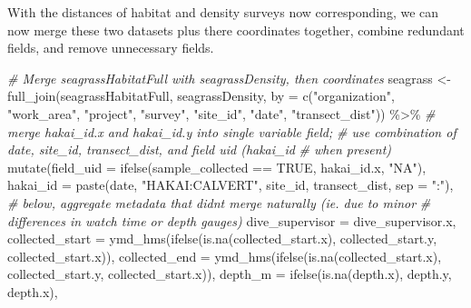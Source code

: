 \documentclass[
]{book}
\newenvironment{Shaded}{\begin{snugshade}}{\end{snugshade}}
\newcommand{\AttributeTok}[1]{\textcolor[rgb]{0.77,0.63,0.00}{#1}}
\newcommand{\CommentTok}[1]{\textcolor[rgb]{0.56,0.35,0.01}{\textit{#1}}}
\newcommand{\ConstantTok}[1]{\textcolor[rgb]{0.00,0.00,0.00}{#1}}
\newcommand{\FunctionTok}[1]{\textcolor[rgb]{0.00,0.00,0.00}{#1}}
\newcommand{\NormalTok}[1]{#1}
\newcommand{\OtherTok}[1]{\textcolor[rgb]{0.56,0.35,0.01}{#1}}
\newcommand{\SpecialCharTok}[1]{\textcolor[rgb]{0.00,0.00,0.00}{#1}}
\newcommand{\StringTok}[1]{\textcolor[rgb]{0.31,0.60,0.02}{#1}}
\begin{document}
With the distances of habitat and density surveys now corresponding, we can
now merge these two datasets plus there coordinates together, combine
redundant fields, and remove unnecessary fields.

\begin{Shaded}
\begin{Highlighting}[]
\CommentTok{\# Merge seagrassHabitatFull with seagrassDensity, then coordinates}
\NormalTok{seagrass }\OtherTok{\textless{}{-}} 
  \FunctionTok{full\_join}\NormalTok{(seagrassHabitatFull, seagrassDensity, }
            \AttributeTok{by =} \FunctionTok{c}\NormalTok{(}\StringTok{"organization"}\NormalTok{,}
                   \StringTok{"work\_area"}\NormalTok{,}
                   \StringTok{"project"}\NormalTok{,}
                   \StringTok{"survey"}\NormalTok{,}
                   \StringTok{"site\_id"}\NormalTok{, }
                   \StringTok{"date"}\NormalTok{,}
                   \StringTok{"transect\_dist"}\NormalTok{)) }\SpecialCharTok{\%\textgreater{}\%}
  \CommentTok{\# merge hakai\_id.x and hakai\_id.y into single variable field;}
  \CommentTok{\# use combination of date, site\_id, transect\_dist, and field uid (hakai\_id }
  \CommentTok{\# when present)}
  \FunctionTok{mutate}\NormalTok{(}\AttributeTok{field\_uid =} \FunctionTok{ifelse}\NormalTok{(sample\_collected }\SpecialCharTok{==} \ConstantTok{TRUE}\NormalTok{, hakai\_id.x, }\StringTok{"NA"}\NormalTok{),}
         \AttributeTok{hakai\_id =} \FunctionTok{paste}\NormalTok{(date, }\StringTok{"HAKAI:CALVERT"}\NormalTok{, site\_id, transect\_dist, }\AttributeTok{sep =} \StringTok{":"}\NormalTok{),}
         \CommentTok{\# below, aggregate metadata that didn\textquotesingle{}t merge naturally (ie. due to minor }
         \CommentTok{\# differences in watch time or depth gauges)}
         \AttributeTok{dive\_supervisor =}\NormalTok{ dive\_supervisor.x,}
         \AttributeTok{collected\_start =} \FunctionTok{ymd\_hms}\NormalTok{(}\FunctionTok{ifelse}\NormalTok{(}\FunctionTok{is.na}\NormalTok{(collected\_start.x),}
\NormalTok{                                          collected\_start.y, }
\NormalTok{                                          collected\_start.x)),}
         \AttributeTok{collected\_end   =} \FunctionTok{ymd\_hms}\NormalTok{(}\FunctionTok{ifelse}\NormalTok{(}\FunctionTok{is.na}\NormalTok{(collected\_start.x),}
\NormalTok{                                          collected\_start.y,}
\NormalTok{                                          collected\_start.x)),}
         \AttributeTok{depth\_m         =} \FunctionTok{ifelse}\NormalTok{(}\FunctionTok{is.na}\NormalTok{(depth.x), depth.y, depth.x),}

\end{Highlighting}
\end{Shaded}
\end{document}
